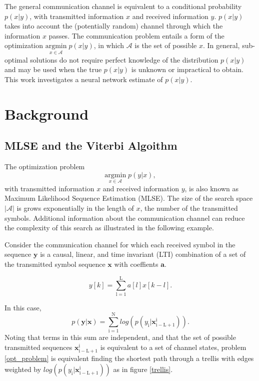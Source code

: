 \documentclass[12pt,a4paper]{article}
\begin{document}
The general communication channel is equivalent to a conditional probability $p(x|y)$, with transmitted information $x$ and received information $y$.  $p(x|y)$ takes into account the (potentially random) channel through which the information $x$ passes. The communication problem entails a form of the optimization $\underset{x\in\mathcal{A}}{\text{argmin}} \; p(x|y)$, in which $\mathcal{A}$ is the set of possible $x$. In general, sub-optimal solutions do not require perfect knowledge of the distribution $p(x|y)$ and may be used when the true $p(x|y)$ is unknown or impractical to obtain. This work investigates a neural network estimate of $p(x|y)$.

\section{Background}

\subsection{MLSE and the Viterbi Algoithm}
The optimization problem
\begin{equation}\label{opt_problem}
\underset{x \in \textit{$\mathcal{A}$}}{\text{argmin}} \; p(y|x),
\end{equation}
 with transmitted information $x$ and received information $y$, is also known as Maximum Likelihood Sequence Estimation (MLSE). 
The size of the search space $|\mathcal{A}|$ is grows exponentially in the length of $x$, the number of the transmitted symbols. Additional information about the communication channel can reduce the complexity of this search as illustrated in the following example.
\par
Consider the communication channel for which each received symbol in the sequence $\mathbf{y}$ is a causal, linear, and time invariant (LTI) combination of a set of the transmitted symbol sequence $\mathbf{x}$ with coeffients $\mathbf{a}$. 

\begin{equation*}
y[k] = \sum_{\mathrm{l=1}}^{\mathrm{L}} a[l]x[k-l].
\end{equation*}

In this case,
\begin{equation*}
p(\mathbf{y}|\mathbf{x})=\sum_{\mathrm{i=1}}^{\mathrm{N}}log(p(y_{\mathrm{i}}|\mathbf{x}_{\mathrm{i-L+1}}^{\mathrm{i}}) ).
\end{equation*}
Noting that terms in this sum are independent, and that the set of possible transmitted sequences $\mathbf{x}_{\mathrm{i-L+1}}^{\mathrm{i}}$ is equivalent to a set of channel states, problem \eqref{opt_problem} is equivalent finding the shortest path through a trellis  with edges weighted by $log(p(y_{\mathrm{i}}|\mathbf{x}_{\mathrm{i-L+1}}^{\mathrm{i}}))$ as in figure \ref{trellis}.
\end{document}
